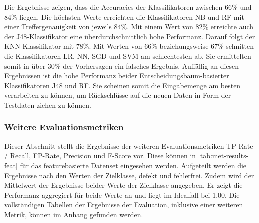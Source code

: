 Die Ergebnisse zeigen, dass die Accuracies der Klassifikatoren zwischen $66\%$ und $84\%$ liegen. Die höchsten Werte erreichten die Klassifikatoren NB und RF mit einer Treffergenauigkeit von jeweils $84\%$. Mit einem Wert von $82\%$ erreichte auch der J48-Klassifikator eine überdurchschnittlich hohe Performanz. Darauf folgt der KNN-Klassifikator mit $78\%$. Mit Werten von $66\%$ beziehungsweise $67\%$ schnitten die Klassifikatoren LR, NN, SGD und SVM am schlechtesten ab. Sie ermittelten somit in über $30\%$ der Vorhersagen ein falsches Ergebnis. Auffällig an diesen Ergebnissen ist die hohe Performanz beider Entscheidungsbaum-basierter Klassifikatoren J48 und RF. Sie scheinen somit die Eingabemenge am besten verarbeiten zu können, um Rückschlüsse auf die neuen Daten in Form der Testdaten ziehen zu können.

\subsubsection*{Weitere Evaluationsmetriken}

Dieser Abschnitt stellt die Ergebnisse der weiteren Evaluationsmetriken TP-Rate / Recall, FP-Rate, Precision und F-Score vor. Diese können in \autoref{tab:met-results-feat} für das featurebasierte Datenset eingesehen werden. Aufgeteilt werden die Ergebnisse nach den Werten der Zielklasse, \glqq defekt\grqq{} und \glqq fehlerfrei\grqq. Zudem wird der Mittelwert der Ergebnisse beider Werte der Zielklasse angegeben. Er zeigt die Performanz aggregiert für beide Werte an und liegt im Idealfall bei 1,00. Die vollständigen Tabellen der Ergebnisse der Evaluation, inklusive einer weiteren Metrik, können im \hyperref[appendix3]{Anhang} gefunden werden.

